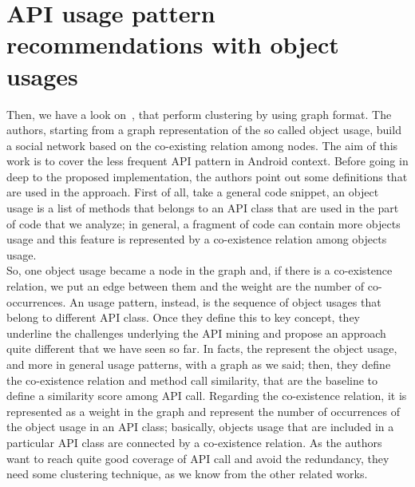 \section{API usage pattern recommendations with object usages}
Then, we have a look on~\cite{niu_api_2017}, that perform clustering by using graph format. The authors, starting from a graph representation of the so called object usage, build a social network based on the co-existing relation among nodes. The aim of this work is to cover the less frequent API pattern in Android context. Before going in deep to the proposed implementation, the authors point out some definitions that are used in the approach. First of all, take a general code snippet, an object usage is a list of methods that belongs to an API class that are used in the part of code that we analyze; in general, a fragment of code can contain more objects usage and this feature is represented by a co-existence relation among objects usage. \\
So, one object usage became a node in the graph and, if there is a co-existence relation, we put an edge between them and the weight are the number of co-occurrences. An usage pattern, instead, is the sequence of object usages that belong to different API class. Once they define this to key concept, they underline the challenges underlying the API mining and propose an approach quite different that we have seen so far. In facts, the represent the object usage, and more in general usage patterns, with a graph as we said; then, they define the co-existence relation and method call similarity, that are the baseline to define a similarity score among API call. Regarding the co-existence relation, it is represented as a weight in the graph and represent the number of occurrences of the object usage in an API class; basically, objects usage that are included in a particular API class are connected by a co-existence relation. As the authors want to reach quite good coverage of API call and avoid the redundancy, they need some clustering technique, as we know from the other related works. \newline
